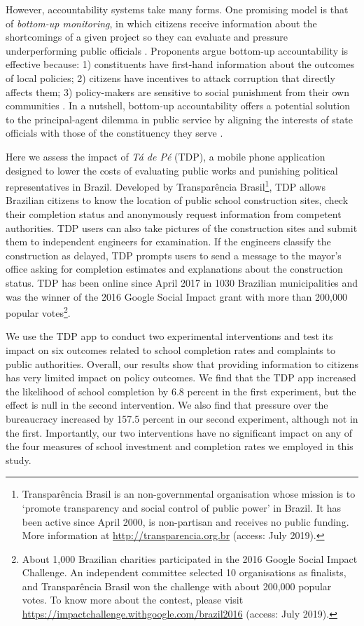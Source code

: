 \documentclass[12pt,a4paper,]{article}
\begin{document}
However, accountability systems take many forms. One promising model is
that of \emph{bottom-up monitoring}, in which citizens receive
information about the shortcomings of a given project so they can
evaluate and pressure underperforming public officials
\citep{kosack2014does, molina2016community, raffler2018weakness}.
Proponents argue bottom-up accountability is effective because: 1)
constituents have first-hand information about the outcomes of local
policies; 2) citizens have incentives to attack corruption that directly
affects them; 3) policy-makers are sensitive to social punishment from
their own communities \citep[570]{serra2011combining}. In a nutshell,
bottom-up accountability offers a potential solution to the
principal-agent dilemma in public service by aligning the interests of
state officials with those of the constituency they serve
\citep[2]{barro1973control, raffler2018weakness}.

Here we assess the impact of \emph{Tá de Pé} (TDP), a mobile phone
application designed to lower the costs of evaluating public works and
punishing political representatives in Brazil. Developed by
Transparência Brasil\footnote{Transparência Brasil is an
  non-governmental organisation whose mission is to `promote
  transparency and social control of public power' in Brazil. It has
  been active since April 2000, is non-partisan and receives no public
  funding. More information at \url{http://transparencia.org.br}
  (access: July 2019).}, TDP allows Brazilian citizens to know the
location of public school construction sites, check their completion
status and anonymously request information from competent authorities.
TDP users can also take pictures of the construction sites and submit
them to independent engineers for examination. If the engineers classify
the construction as delayed, TDP prompts users to send a message to the
mayor's office asking for completion estimates and explanations about
the construction status. TDP has been online since April 2017 in 1030
Brazilian municipalities and was the winner of the 2016 Google Social
Impact grant with more than 200,000 popular votes\footnote{About 1,000
  Brazilian charities participated in the 2016 Google Social Impact
  Challenge. An independent committee selected 10 organisations as
  finalists, and Transparência Brasil won the challenge with about
  200,000 popular votes. To know more about the contest, please visit
  \url{https://impactchallenge.withgoogle.com/brazil2016} (access: July
  2019).}.

We use the TDP app to conduct two experimental interventions and test
its impact on six outcomes related to school completion rates and
complaints to public authorities. Overall, our results show that
providing information to citizens has very limited impact on policy
outcomes. We find that the TDP app increased the likelihood of school
completion by 6.8 percent in the first experiment, but the effect is
null in the second intervention. We also find that pressure over the
bureaucracy increased by 157.5 percent in our second experiment,
although not in the first. Importantly, our two interventions have no
significant impact on any of the four measures of school investment and
completion rates we employed in this study.
\end{document}
